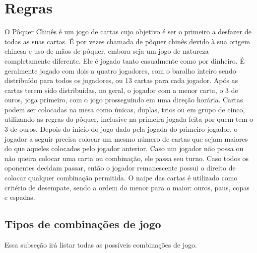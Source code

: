 \documentclass[12pt]{article}
\begin{document}
\section{Regras}
\label{regras}

O Pôquer Chinês \cite{bigtwo} é um jogo de cartas cujo objetivo é ser o primeiro a desfazer de todas as suas cartas. É por vezes chamada de pôquer chinês devido à sua origem chinesa e uso de mãos de pôquer, embora seja um jogo de natureza completamente diferente.
Ele é jogado tanto casualmente como por dinheiro. É geralmente jogado com dois a quatro jogadores, com o baralho inteiro sendo distribuído para todos os jogadores, ou 13 cartas para cada jogador.
Após as cartas terem sido distribuídas, no geral, o jogador com a menor carta, o 3 de ouros, joga primeiro, com o jogo prosseguindo em uma direção horária. Cartas podem ser colocadas na mesa como únicas, duplas, trios ou em grupo de cinco, utilizando as regras do pôquer, inclusive na primeira jogada feita por quem tem o 3 de ouros.
Depois do início do jogo dado pela jogada do primeiro jogador, o jogador a seguir precisa colocar um mesmo número de cartas que sejam maiores do que aqueles colocados pelo jogador anterior. Caso um jogador não possa ou não queira colocar uma carta ou combinação, ele passa seu turno. Caso todos os oponentes decidam passar, então o jogador remanescente possui o direito de colocar qualquer combinação permitida. O naipe das cartas é utilizado como critério de desempate, sendo a ordem do menor para o maior: ouros, paus, copas e espadas.

\subsection{Tipos de combinações de jogo}
\vspace{0.2 true cm}

Essa subseção irá listar todas as possíveis combinações de jogo.
\end{document}
